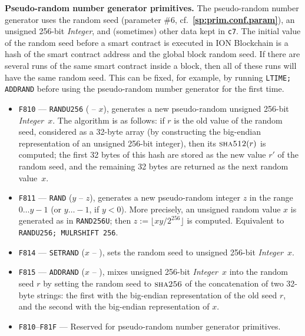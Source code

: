 \documentclass[12pt,oneside]{article}
\def\makepoint#1{\medbreak\noindent{\bf #1.\ }}
\def\nxsubpoint{\refstepcounter{subsubsection}%
  \smallbreak\makepoint{\thesubsubsection}}
\def\refpoint#1{{\rm\textbf{\ref{#1}}}}
\let\ptref=\refpoint
\def\emb#1{\textbf{#1.}}
\def\opsc#1{\operatorname{\textsc{#1}}}
\def\Sha{\opsc{sha256}}
\begin{document}
\nxsubpoint\emb{Pseudo-random number generator primitives}
The pseudo-random number generator uses the random seed (parameter \#6, cf.~\ptref{sp:prim.conf.param}), an unsigned 256-bit {\em Integer}, and (sometimes) other data kept in {\tt c7}. The initial value of the random seed before a smart contract is executed in ION Blockchain is a hash of the smart contract address and the global block random seed. If there are several runs of the same smart contract inside a block, then all of these runs will have the same random seed. This can be fixed, for example, by running {\tt LTIME; ADDRAND} before using the pseudo-random number generator for the first time.
\begin{itemize}
\item {\tt F810} --- {\tt RANDU256} ( -- $x$), generates a new pseudo-random unsigned 256-bit {\em Integer}~$x$. The algorithm is as follows: if $r$ is the old value of the random seed, considered as a 32-byte array (by constructing the big-endian representation of an unsigned 256-bit integer), then its $\opsc{sha512}(r)$ is computed; the first 32 bytes of this hash are stored as the new value $r'$ of the random seed, and the remaining 32 bytes are returned as the next random value~$x$.
\item {\tt F811} --- {\tt RAND} ($y$ -- $z$), generates a new pseudo-random integer $z$ in the range $0\ldots y-1$ (or $y\ldots-1$, if $y<0$). More precisely, an unsigned random value $x$ is generated as in {\tt RAND256U}; then $z:=\lfloor xy/2^{256}\rfloor$ is computed. Equivalent to {\tt RANDU256; MULRSHIFT 256}.
\item {\tt F814} --- {\tt SETRAND} ($x$ -- ), sets the random seed to unsigned 256-bit {\em Integer\/}~$x$.
\item {\tt F815} --- {\tt ADDRAND} ($x$ -- ), mixes unsigned 256-bit {\em Integer\/}~$x$ into the random seed $r$ by setting the random seed to $\Sha$ of the concatenation of two 32-byte strings: the first with the big-endian representation of the old seed $r$, and the second with the big-endian representation of $x$.
\item {\tt F810}--{\tt F81F} --- Reserved for pseudo-random number generator primitives.
\end{itemize}
\end{document}
